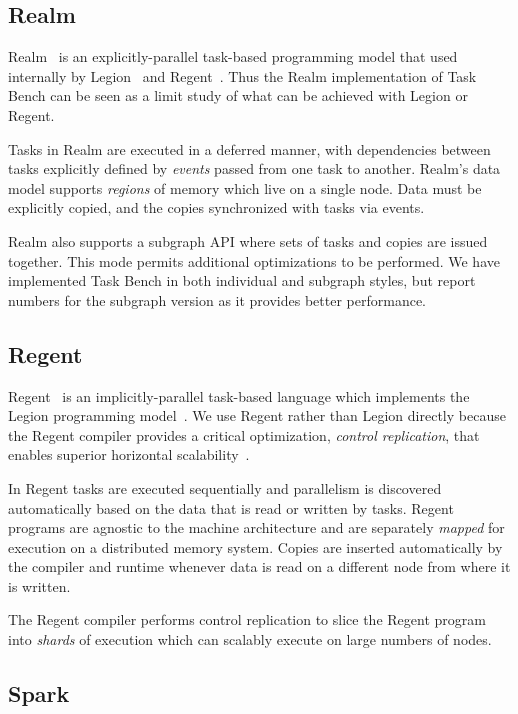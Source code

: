 \subsection{Realm}

Realm~\cite{Realm14} is an explicitly-parallel task-based programming
model that used internally by Legion~\cite{Legion12} and
Regent~\cite{Regent15}. Thus the Realm implementation of Task Bench can be
seen as a limit study of what can be achieved with Legion or Regent.

Tasks in Realm are executed in a deferred manner, with dependencies
between tasks explicitly defined by \emph{events} passed from one task
to another. Realm's data model supports \emph{regions} of memory which live on a single
node. Data must be explicitly copied, and the copies synchronized with
tasks via events.

Realm also supports a subgraph API where sets of tasks and copies are
issued together. This mode permits additional optimizations to be
performed. We have implemented Task Bench in both individual and
subgraph styles, but report numbers for the subgraph version as it
provides better performance.

\subsection{Regent}

Regent~\cite{Regent15} is an implicitly-parallel task-based language
which implements the Legion programming model~\cite{Legion12}. We use
Regent rather than Legion directly because the Regent compiler
provides a critical optimization, \emph{control replication}, that
enables superior horizontal scalability~\cite{ControlReplication17}.

In Regent tasks are executed sequentially and parallelism is
discovered automatically based on the data that is read or written by
tasks. Regent programs are agnostic to the machine architecture and
are separately \emph{mapped} for execution on a distributed memory
system. Copies are inserted automatically by the compiler and runtime
whenever data is read on a different node from where it is written.

The Regent compiler performs control replication to slice the Regent
program into \emph{shards} of execution which can scalably execute on
large numbers of nodes.

\subsection{Spark}

